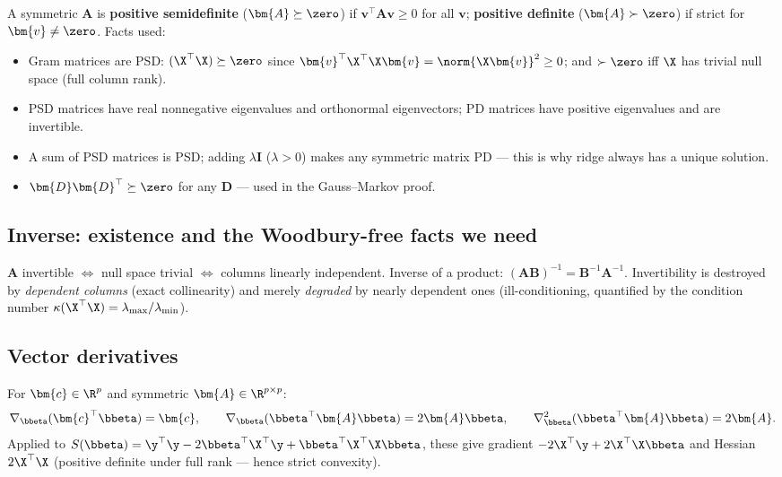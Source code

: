 A symmetric $\bm{A}$ is \textbf{positive semidefinite} ($\bm{A} \succeq \zero$) if $\bm{v}^\top \bm{A} \bm{v} \geq 0$ for all $\bm{v}$; \textbf{positive definite} ($\bm{A} \succ \zero$) if strict for $\bm{v} \neq \zero$. Facts used:
\begin{itemize}
  \item Gram matrices are PSD: $(\X^\top\X) \succeq \zero$ since $\bm{v}^\top \X^\top \X \bm{v} = \norm{\X\bm{v}}^2 \geq 0$; and $\succ \zero$ iff $\X$ has trivial null space (full column rank).
  \item PSD matrices have real nonnegative eigenvalues and orthonormal eigenvectors; PD matrices have positive eigenvalues and are invertible.
  \item A sum of PSD matrices is PSD; adding $\lambda \bm{I}$ ($\lambda > 0$) makes any symmetric matrix PD — this is why ridge always has a unique solution.
  \item $\bm{D}\bm{D}^\top \succeq \zero$ for any $\bm{D}$ — used in the Gauss--Markov proof.
\end{itemize}

\subsection{Inverse: existence and the Woodbury-free facts we need}

$\bm{A}$ invertible $\iff$ null space trivial $\iff$ columns linearly independent. Inverse of a product: $(\bm{A}\bm{B})^{-1} = \bm{B}^{-1}\bm{A}^{-1}$. Invertibility is destroyed by \emph{dependent columns} (exact collinearity) and merely \emph{degraded} by nearly dependent ones (ill-conditioning, quantified by the condition number $\kappa(\X^\top\X) = \lambda_{\max}/\lambda_{\min}$).

\subsection{Vector derivatives}

For $\bm{c} \in \R^p$ and symmetric $\bm{A} \in \R^{p \times p}$:
\[
  \nabla_{\bbeta} (\bm{c}^\top \bbeta) = \bm{c},
  \qquad
  \nabla_{\bbeta} (\bbeta^\top \bm{A} \bbeta) = 2 \bm{A} \bbeta,
  \qquad
  \nabla^2_{\bbeta} (\bbeta^\top \bm{A} \bbeta) = 2 \bm{A}.
\]
Applied to $S(\bbeta) = \y^\top\y - 2\bbeta^\top\X^\top\y + \bbeta^\top\X^\top\X\bbeta$, these give gradient $-2\X^\top\y + 2\X^\top\X\bbeta$ and Hessian $2\X^\top\X$ (positive definite under full rank — hence strict convexity).

